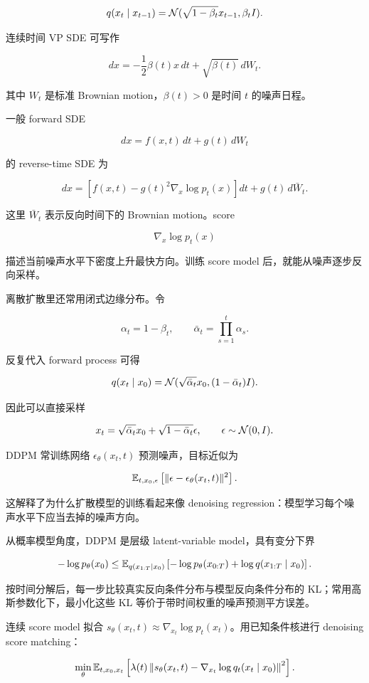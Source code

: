 \[
  q(x_t\mid x_{t-1})
  =
  \mathcal{N}(\sqrt{1-\beta_t}x_{t-1},\beta_t I).
\]

连续时间 VP SDE 可写作

\[
  dx=-\frac12\beta(t)x\,dt+\sqrt{\beta(t)}\,dW_t.
\]

其中 \(W_t\) 是标准 Brownian motion，\(\beta(t)>0\) 是时间 \(t\) 的噪声日程。

一般 forward SDE

\[
  dx=f(x,t)\,dt+g(t)\,dW_t
\]

的 reverse-time SDE 为

\[
  dx=
  \left[
    f(x,t)-g(t)^2\nabla_x\log p_t(x)
  \right]dt
  +
  g(t)\,d\bar W_t.
\]

这里 \(\bar W_t\) 表示反向时间下的 Brownian motion。score

\[
  \nabla_x\log p_t(x)
\]

描述当前噪声水平下密度上升最快方向。训练 score model 后，就能从噪声逐步反向采样。

离散扩散里还常用闭式边缘分布。令

\[
  \alpha_t=1-\beta_t,
  \qquad
  \bar\alpha_t=\prod_{s=1}^{t}\alpha_s.
\]

反复代入 forward process 可得

\[
  q(x_t\mid x_0)
  =
  \mathcal{N}(\sqrt{\bar\alpha_t}x_0,(1-\bar\alpha_t)I).
\]

因此可以直接采样

\[
  x_t
  =
  \sqrt{\bar\alpha_t}x_0
  +
  \sqrt{1-\bar\alpha_t}\epsilon,
  \qquad
  \epsilon\sim\mathcal{N}(0,I).
\]

DDPM 常训练网络 \(\epsilon_\theta(x_t,t)\) 预测噪声，目标近似为

\[
  \mathbb{E}_{t,x_0,\epsilon}
  \left[
    \|\epsilon-\epsilon_\theta(x_t,t)\|^2
  \right].
\]

这解释了为什么扩散模型的训练看起来像 denoising regression：模型学习每个噪声水平下应当去掉的噪声方向。

从概率模型角度，DDPM 是层级 latent-variable model，具有变分下界

\[
  -\log p_\theta(x_0)\le
  \mathbb{E}_{q(x_{1:T}\mid x_0)}
  \left[-\log p_\theta(x_{0:T})+\log q(x_{1:T}\mid x_0)\right].
\]

按时间分解后，每一步比较真实反向条件分布与模型反向条件分布的 KL；常用高斯参数化下，最小化这些 KL 等价于带时间权重的噪声预测平方误差。

连续 score model 拟合 \(s_\theta(x_t,t)\approx\nabla_{x_t}\log p_t(x_t)\)。用已知条件核进行 denoising score matching：

\[
  \min_\theta\mathbb{E}_{t,x_0,x_t}
  \left[\lambda(t)\left\|s_\theta(x_t,t)-\nabla_{x_t}\log q_t(x_t\mid x_0)\right\|^2\right].
\]

